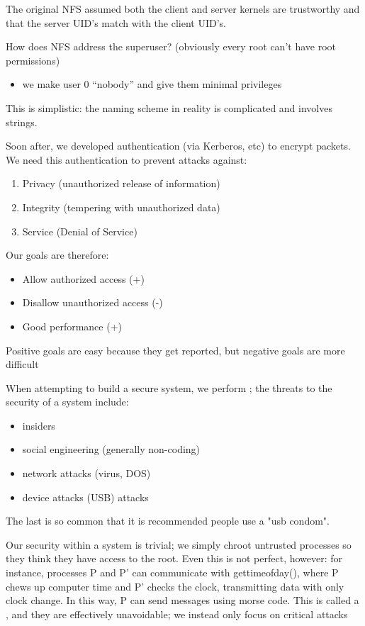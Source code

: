 \documentclass[../../lecture_notes.tex]{subfiles}
\begin{document}
The original NFS assumed both the client and server kernels are trustworthy and that the server UID’s match with the client UID’s.

How does NFS address the superuser? (obviously every root can’t have root permissions)
\begin{itemize}
\item we make user 0 “nobody” and give them minimal privileges
\end{itemize}
This is simplistic: the naming scheme in reality is complicated and involves strings.

Soon after, we developed authentication (via Kerberos, etc) to encrypt packets. We need this authentication to prevent attacks against:
\begin{enumerate}[nosep]
\item Privacy (unauthorized release of information)
\item Integrity (tempering with unauthorized data)
\item Service (Denial of Service)
\end{enumerate}


Our goals are therefore:
\begin{itemize}
\item Allow authorized access (+)
\item Disallow unauthorized access (-)
\item Good performance (+)
\end{itemize}
Positive goals are easy because they get reported, but negative goals are more difficult


When attempting to build a secure system, we perform ; the threats to the security of a system include:
\begin{itemize}
\item insiders
\item social engineering (generally non-coding)
\item network attacks (virus, DOS)
\item device attacks (USB) attacks
\end{itemize}
The last is so common that it is recommended people use a "usb condom".


Our security within a system is trivial; we simply chroot untrusted processes so they think they have access to the root. Even this is not perfect, however: for instance, processes P and P’ can communicate with gettimeofday(), where P chews up computer time and P’ checks the clock, transmitting data with only clock change. In this way, P can send messages using morse code. This is called a , and they are effectively unavoidable; we instead only focus on critical attacks
\end{document}
